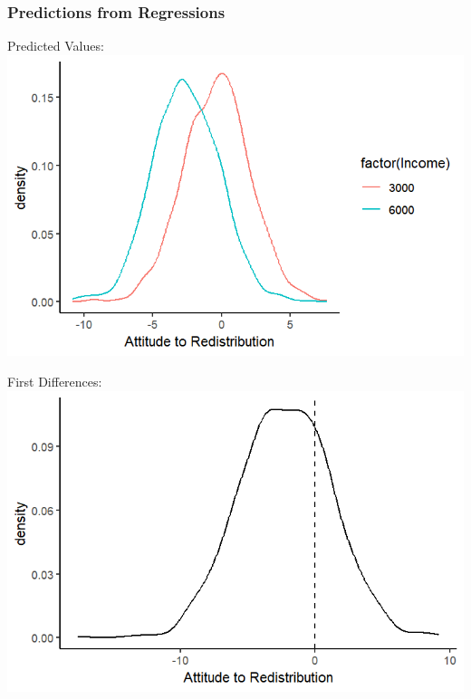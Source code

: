 \documentclass[xcolor=x11names,compress]{beamer}\usepackage[]{graphicx}\usepackage[]{color}
\makeatletter
\def\maxwidth{ %
  \ifdim\Gin@nat@width>\linewidth
    \linewidth
  \else
    \Gin@nat@width
  \fi
}
\newenvironment{knitrout}{}{} %
\renewcommand{\(}{\begin{columns}}
\renewcommand{\)}{\end{columns}}
\newcommand{\<}[1]{\begin{column}{#1}}
\renewcommand{\>}{\end{column}}
\makeatother
\begin{document}
\begin{frame}
\frametitle{Predictions from Regressions}
\begin{multicols}{2}
Predicted Values:
\begin{knitrout}
\color{fgcolor}
\includegraphics[width=\maxwidth]{figure/predictions2-1} 

\end{knitrout}
\columnbreak
First Differences:
\begin{knitrout}
\color{fgcolor}
\includegraphics[width=\maxwidth]{figure/predictions3-1} 

\end{knitrout}
\end{multicols}
\end{frame}
\end{document}
